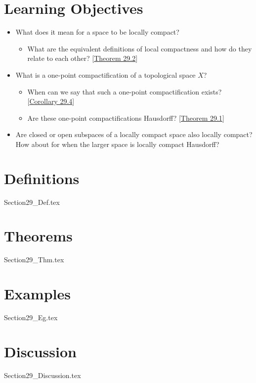 \section{Learning Objectives}

\begin{itemize}
    \item What does it mean for a space to be locally compact? 
        \begin{itemize}
            \item What are the equivalent definitions of local compactness and how do 
                they relate to each other?
                [\hyperlink{thm:29.2}{Theorem 29.2}]
        \end{itemize}
    \item What is a one-point compactification of a topological space \( X \)?
        \begin{itemize}
            \item When can we say that such a one-point compactification exists?
                [\hyperlink{cor:29.4}{Corollary 29.4}]
            \item Are these one-point compactifications Hausdorff? 
                [\hyperlink{thm:29.1}{Theorem 29.1}]
        \end{itemize}
    \item Are closed or open subspaces of a locally compact space also locally compact?
        How about for when the larger space is locally compact Hausdorff?
\end{itemize}

\section{Definitions}

{Section29_Def.tex}

\section{Theorems}

{Section29_Thm.tex}

\section{Examples}

{Section29_Eg.tex}

\section{Discussion}

{Section29_Discussion.tex}